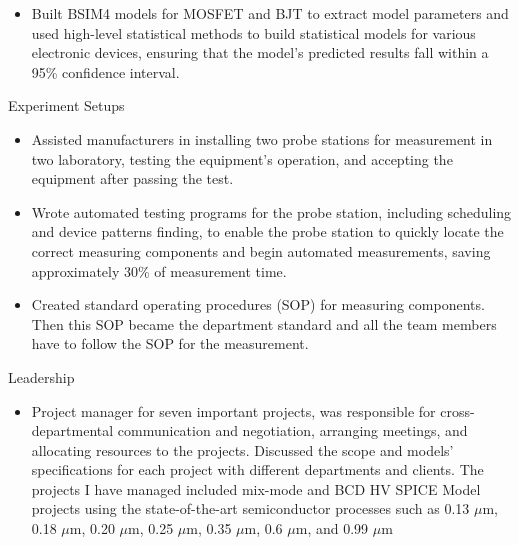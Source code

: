 \documentclass[margin, 10pt]{res} %
\begin{document}
\begin{resume}
\begin{itemize}
    \item Built BSIM4 models for MOSFET and BJT to extract model parameters and used high-level statistical methods to build statistical models for various electronic devices, ensuring that the model's predicted results fall within a 95\% confidence interval.
\end{itemize}
\textrm{Experiment Setups}
\begin{itemize}
    \item Assisted manufacturers in installing two probe stations for measurement in two laboratory, testing the equipment's operation, and accepting the equipment after passing the test.
    \item Wrote automated testing programs for the probe station, including scheduling and device patterns finding, to enable the probe station to quickly locate the correct measuring components and begin automated measurements, saving approximately 30\% of measurement time.
    \item Created standard operating procedures (SOP) for measuring components. Then this SOP became the department standard and all the team members have to follow the SOP for the measurement.
\end{itemize}
\textrm{Leadership}
\begin{itemize}
    \item Project manager for seven important projects, was responsible for cross-departmental communication and negotiation, arranging meetings, and allocating resources to the projects. Discussed the scope and models' specifications for each project with different departments and clients. The projects I have managed included mix-mode and BCD HV SPICE Model projects using the state-of-the-art semiconductor processes such as 0.13 $\mu$m, 0.18 $\mu$m, 0.20 $\mu$m, 0.25 $\mu$m, 0.35 $\mu$m, 0.6 $\mu$m, and 0.99 $\mu$m

\end{itemize}
\end{resume}
\end{document}
